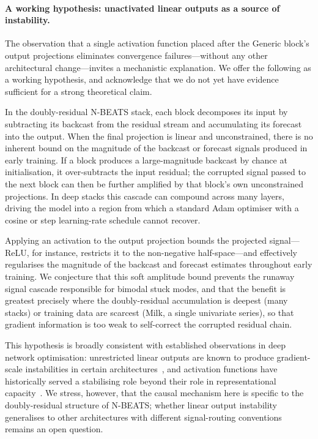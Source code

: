 \documentclass{article}
\begin{document}
\paragraph{A working hypothesis: unactivated linear outputs as a source of instability.}
The observation that a single activation function placed after the Generic block's output projections eliminates convergence failures---without any other architectural change---invites a mechanistic explanation. We offer the following as a working hypothesis, and acknowledge that we do not yet have evidence sufficient for a strong theoretical claim.

In the doubly-residual N-BEATS stack, each block decomposes its input by subtracting its backcast from the residual stream and accumulating its forecast into the output. When the final projection is linear and unconstrained, there is no inherent bound on the magnitude of the backcast or forecast signals produced in early training. If a block produces a large-magnitude backcast by chance at initialisation, it over-subtracts the input residual; the corrupted signal passed to the next block can then be further amplified by that block's own unconstrained projections. In deep stacks this cascade can compound across many layers, driving the model into a region from which a standard Adam optimiser with a cosine or step learning-rate schedule cannot recover.

Applying an activation to the output projection bounds the projected signal---ReLU, for instance, restricts it to the non-negative half-space---and effectively regularises the magnitude of the backcast and forecast estimates throughout early training. We conjecture that this soft amplitude bound prevents the runaway signal cascade responsible for bimodal stuck modes, and that the benefit is greatest precisely where the doubly-residual accumulation is deepest (many stacks) or training data are scarcest (Milk, a single univariate series), so that gradient information is too weak to self-correct the corrupted residual chain.

This hypothesis is broadly consistent with established observations in deep network optimisation: unrestricted linear outputs are known to produce gradient-scale instabilities in certain architectures~\citep{hochreiter1991untersuchungen,pascanu2013difficulty}, and activation functions have historically served a stabilising role beyond their role in representational capacity~\citep{glorot2011deep}. We stress, however, that the causal mechanism here is specific to the doubly-residual structure of N-BEATS; whether linear output instability generalises to other architectures with different signal-routing conventions remains an open question.
\end{document}
